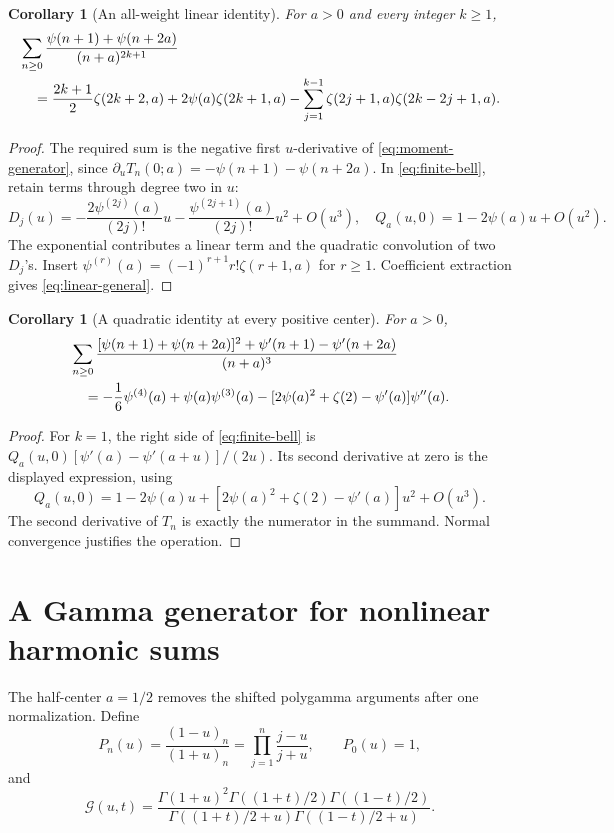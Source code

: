 \documentclass[11pt,a4paper]{article}
\numberwithin{equation}{section}
\newtheorem{corollary}[theorem]{Corollary}
\theoremstyle{definition}\newtheorem{definition}[theorem]{Definition}
\theoremstyle{remark}\newtheorem{remark}[theorem]{Remark}
\newcommand{\Gcal}{\mathcal G}\newcommand{\Rcal}{\mathcal R}
\begin{document}
\begin{corollary}[An all-weight linear identity]
\label{cor:linear}
For $a>0$ and every integer $k\ge1$,
\begin{align}
 &\sum_{n\ge0}\frac{\psi(n+1)+\psi(n+2a)}{(n+a)^{2k+1}}
 \notag\\
 &\quad=\frac{2k+1}{2}\zeta(2k+2,a)
        +2\psi(a)\zeta(2k+1,a)
        -\sum_{j=1}^{k-1}\zeta(2j+1,a)\zeta(2k-2j+1,a).
 \label{eq:linear-general}
\end{align}
\end{corollary}
\begin{proof}
The required sum is the negative first $u$-derivative of
\eqref{eq:moment-generator}, since
$\partial_uT_n(0;a)=-\psi(n+1)-\psi(n+2a)$.
In \eqref{eq:finite-bell}, retain terms through degree two in $u$:
\[
 D_j(u)=-\frac{2\psi^{(2j)}(a)}{(2j)!}u
       -\frac{\psi^{(2j+1)}(a)}{(2j)!}u^2+O(u^3),
 \quad Q_a(u,0)=1-2\psi(a)u+O(u^2).
\]
The exponential contributes a linear term and the quadratic convolution
of two $D_j$'s. Insert
$\psi^{(r)}(a)=(-1)^{r+1}r!\zeta(r+1,a)$ for $r\ge1$.
Coefficient extraction gives \eqref{eq:linear-general}.
\end{proof}

\begin{corollary}[A quadratic identity at every positive center]
\label{cor:quadratic}
For $a>0$,
\begin{align}
 &\sum_{n\ge0}\frac{[\psi(n+1)+\psi(n+2a)]^2
                    +\psi'(n+1)-\psi'(n+2a)}{(n+a)^3}\notag\\
 &\quad=-\frac16\psi^{(4)}(a)+\psi(a)\psi^{(3)}(a)
       -[2\psi(a)^2+\zeta(2)-\psi'(a)]\psi''(a).
 \label{eq:quadratic-general}
\end{align}
\end{corollary}
\begin{proof}
For $k=1$, the right side of \eqref{eq:finite-bell} is
$Q_a(u,0)[\psi'(a)-\psi'(a+u)]/(2u)$. Its second derivative at
zero is the displayed expression, using
\[
 Q_a(u,0)=1-2\psi(a)u+
 [2\psi(a)^2+\zeta(2)-\psi'(a)]u^2+O(u^3).
\]
The second derivative of $T_n$ is exactly the numerator in the
summand. Normal convergence justifies the operation.
\end{proof}

\section{A Gamma generator for nonlinear harmonic sums}
\label{sec:harmonic}
The half-center $a=1/2$ removes the shifted polygamma arguments after
one normalization. Define
\begin{equation}
 P_n(u)=\frac{(1-u)_n}{(1+u)_n}
       =\prod_{j=1}^n\frac{j-u}{j+u},\qquad P_0(u)=1,
 \label{eq:Pn}
\end{equation}
and
\begin{equation}
 \Gcal(u,t)=\frac{\Gamma(1+u)^2
                   \Gamma((1+t)/2)\Gamma((1-t)/2)}
 {\Gamma((1+t)/2+u)\Gamma((1-t)/2+u)}.
 \label{eq:G}
\end{equation}
\end{document}
